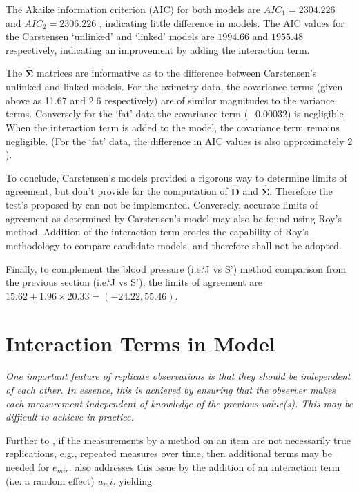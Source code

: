 \documentclass[12pt, a4paper]{report}
\theoremstyle{plain}
\theoremstyle{definition}
\theoremstyle{remark}
\begin{document}
The Akaike information criterion (AIC) for both models are $AIC_{1} = 2304.226$ and $AIC_{2} = 2306.226$ , indicating little difference in models. The AIC values for the Carstensen `unlinked' and `linked' models are $1994.66$ and $1955.48$ respectively, indicating an improvement by adding the interaction term.

The $\boldsymbol{\hat{\Sigma}}$ matrices are informative as to the difference between Carstensen's unlinked and linked models. For the oximetry data, the covariance terms (given above as 11.67 and 2.6 respectively) are of similar magnitudes to the variance terms. Conversely for the `fat' data the covariance term ($-0.00032$) is negligible. When the interaction term is added to the model, the covariance term remains negligible. (For the `fat' data, the difference in AIC values is also approximately $2$).

To conclude, Carstensen's models provided a rigorous way to determine limits of agreement, but don't provide for the computation of $\boldsymbol{\hat{D}}$ and $\boldsymbol{\hat{\Sigma}}$. Therefore the test's proposed by \citet{ARoy2009} can not be implemented. Conversely, accurate limits of agreement as determined by Carstensen's model may also be found using Roy's method. Addition of the interaction term erodes the capability of Roy's methodology to compare candidate models, and therefore shall not be adopted.

Finally, to complement the blood pressure (i.e.`J vs S') method comparison from the previous section (i.e.`J vs S'), the limits of agreement are $15.62 \pm 1.96 \times 20.33 = (-24.22, 55.46)$.


\section{Interaction Terms in Model}

\emph{
	One important feature of replicate observations is that they should be independent
	of each other. In essence, this is achieved by ensuring that the observer makes each
	measurement independent of knowledge of the previous value(s). This may be difficult
	to achieve in practice.}


Further to \citet{barnhart}, if the measurements by a method on an item are not necessarily true replications, e.g., repeated measures over time, then additional terms may be needed for $e_{mir}$. \citet{BXC2008} also addresses this issue by the addition of an interaction term (i.e. a random effect) $u_mi$, yielding
\end{document}

